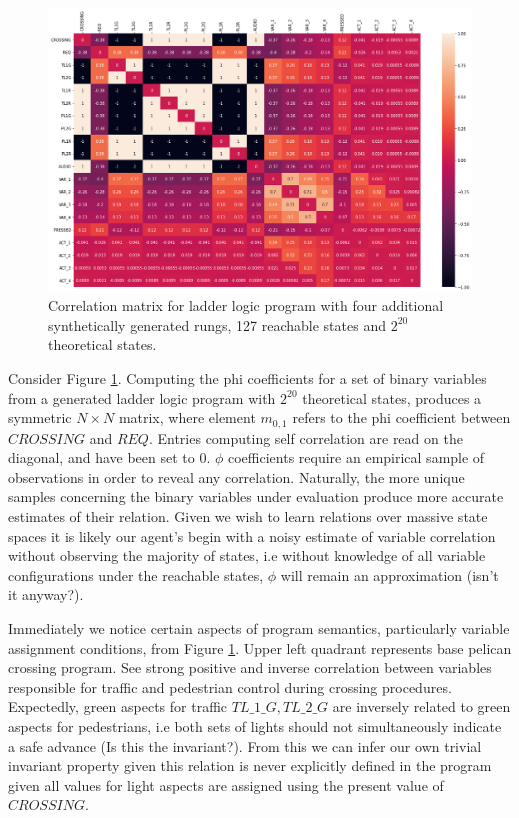 \documentclass[runningheads]{llncs}
\begin{document}
\begin{figure}[!t]
	\label{fig:heatmap}
	\centering
	\includegraphics[width=\columnwidth]{figs/heatmap.png}
	\caption{Correlation matrix for ladder logic program with four additional synthetically generated rungs, 127 reachable states and $2^{20}$ theoretical states.}
\end{figure}


Consider Figure \ref{fig:heatmap}. Computing the phi coefficients for a set of binary variables from a generated ladder logic program with $2^{20}$ theoretical states, produces a symmetric $N\times N$ matrix, where element $m_{0,1}$ refers to the phi coefficient between $CROSSING$ and $REQ$. Entries computing self correlation are read on the diagonal, and have been set to $0$. $\phi$ coefficients require an empirical sample of observations in order to reveal any correlation. Naturally, the more unique samples concerning the binary variables under evaluation produce more accurate estimates of their relation. Given we wish to learn relations over massive state spaces it is likely our agent's begin with a noisy estimate of variable correlation without observing the majority of states, i.e without knowledge of all variable configurations under the reachable states, $\phi$ will remain an approximation (isn't it anyway?). 

Immediately we notice certain aspects of program semantics, particularly variable assignment conditions, from Figure \ref{fig:heatmap}. Upper left quadrant represents base pelican crossing program. See strong positive and inverse correlation between variables responsible for traffic and pedestrian control during crossing procedures. Expectedly, green aspects for traffic $TL\_1\_G, TL\_2\_G$ are inversely related to green aspects for pedestrians, i.e both sets of lights should not simultaneously indicate a safe advance (Is this the invariant?). From this we can infer our own trivial invariant property given this relation is never explicitly defined in the program given all values for light aspects are assigned using the present value of $CROSSING$.
\end{document}
